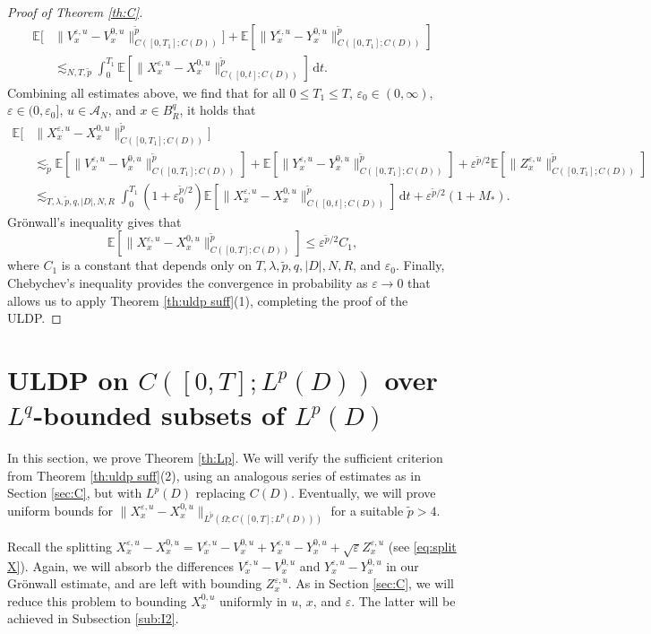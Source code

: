 \documentclass{amsart}
\theoremstyle{plain}
\theoremstyle{remark}
\theoremstyle{plain}
\numberwithin{equation}{section}
\newcommand{\Cper}{C(D)}
\newcommand{\E}{{\mathbb E}}
\newcommand{\eps}{\varepsilon}
\newcommand{\Om}{\Omega}
\newcommand{\A}{{\mathcal A}}
\newcommand{\dd}{\,\mathrm{d}}
\begin{document}
\begin{proof}[Proof of Theorem \ref{th:C}]
\begin{align*}
\E[&\|V_x^{\eps,u}-V_x^{0,u}\|_{C([0,T_1];\Cper)}^{\tilde p}]+
\E[\|Y_x^{\eps,u}-Y_x^{0,u}\|_{C([0,T_1];\Cper)}^{\tilde p}]\\
&\lesssim_{N,T,\tilde p}
\int_0^{T_1}\E[\|X_x^{\eps,u}-X_x^{0,u}\|_{C([0,t];\Cper)}^{\tilde p}]\dd t.
\end{align*}
Combining all estimates above, we find that for all $0\leq T_1\leq T$,   $\eps_0\in(0,\infty)$, $\eps\in(0,\eps_0]$, $u\in\A_N$, and $x\in B_R^q$, it holds that
\begin{align*}
\E[&\|X_x^{\eps,u}-X_x^{0,u}\|_{C([0,T_1];\Cper)}^{\tilde p}] \\&\lesssim_{\tilde p}\E[\|V_x^{\eps,u}-V_x^{0,u}\|_{C([0,T_1];\Cper)}^{\tilde p}] + \E[\|Y_x^{\eps,u}-Y_x^{0,u}\|_{C([0,T_1];\Cper)}^{\tilde p}] + \eps^{\tilde p/2}\E[\|Z_x^{\eps,u}\|_{C([0,T_1];\Cper)}^{\tilde p}] \\ &\lesssim_{T,\lambda,\tilde p,q,|D|, N,R}\int_0^{T_1} (1+\eps_0^{\tilde p/2})\E[\|X_x^{\eps,u}-X_x^{0,u}\|_{C([0,t];\Cper)}^{\tilde p}]\dd t+\eps^{\tilde p/2}(1+M_*). 
\end{align*} 
Gr\"onwall's inequality gives that 
\[
\E[\|X_x^{\eps,u}-X_x^{0,u}\|_{C([0,T];\Cper)}^{\tilde p}]\leq \eps^{\tilde p/2}C_1,
\]
where $C_1$ is a constant that depends only on $T,\lambda,\tilde p,q,|D|, N,R$, and $\eps_0$. Finally,  Chebychev's inequality provides the convergence in probability as $\eps\to 0$ that allows us to apply Theorem \ref{th:uldp suff}(1), completing the proof of the ULDP. 
\end{proof}


\section{ULDP on $C([0,T];L^p(D))$ over $L^q$-bounded subsets of $L^p(D)$}\label{sec:Lp}

In this section, we prove Theorem \ref{th:Lp}.  We will verify the sufficient criterion from Theorem \ref{th:uldp suff}(2), using an analogous series of estimates as in Section \ref{sec:C}, but with $L^p(D)$ replacing $C(D)$. Eventually, we will prove  uniform bounds for $ \| X_x^{\eps,u} - X_x^{0,u} \|_{L^{\tilde p}(\Om;C([0,T];L^{p}(D)))}$ for a suitable ${\tilde p}>4$. 

Recall the splitting  $X_x^{\eps,u}-X_x^{0,u}=V_x^{\eps,u}-V_x^{0,u}+Y_x^{\eps,u}-Y_x^{0,u}+\sqrt{\eps}Z_x^{\eps,u}$ (see \eqref{eq:split X}). 
Again, we will absorb the differences $V_x^{\eps,u}-V_x^{0,u}$ and $Y_x^{\eps,u}-Y_x^{0,u}$ in our Gr\"onwall estimate, and are left with bounding $Z_x^{\eps,u}$. As in Section \ref{sec:C}, we will reduce this problem to bounding $X_x^{0,u}$ uniformly in $u$, $x$, and $\eps$. The latter will be achieved in Subsection \ref{sub:I2}. 
\end{document}
